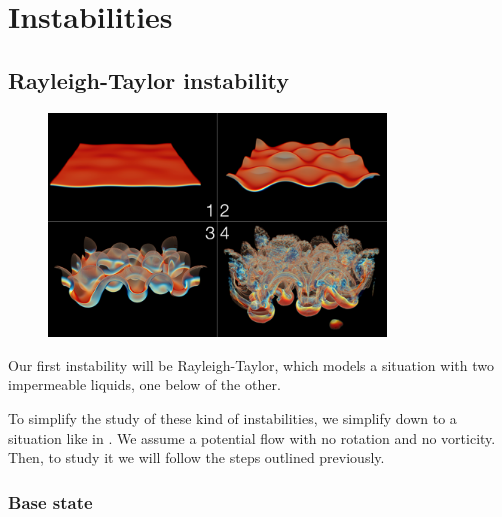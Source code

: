 \documentclass[palatino]{epflnotes}
\begin{document}
\chapter{Instabilities}

\section{Rayleigh-Taylor instability}

\begin{figure}[hbtp]
\begin{minipage}[b]{0.45\textwidth}
\centering
\includegraphics[width=0.8\textwidth]{img/RayleighTaylorInstability.png}
\label{fig:RayleighTaylorInterfaceImage}
\end{minipage}
\hfill
\begin{minipage}[b]{0.45\textwidth}
\label{fig:RayleighTaylorModel}
\end{minipage}
\end{figure}

Our first instability will be Rayleigh-Taylor, which models a situation with two impermeable liquids, one below of the other.

To simplify the study of these kind of instabilities, we simplify down to a situation like in . We assume a potential flow with no rotation and no vorticity. Then, to study it we will follow the steps outlined previously.

\subsection{Base state}
\end{document}
